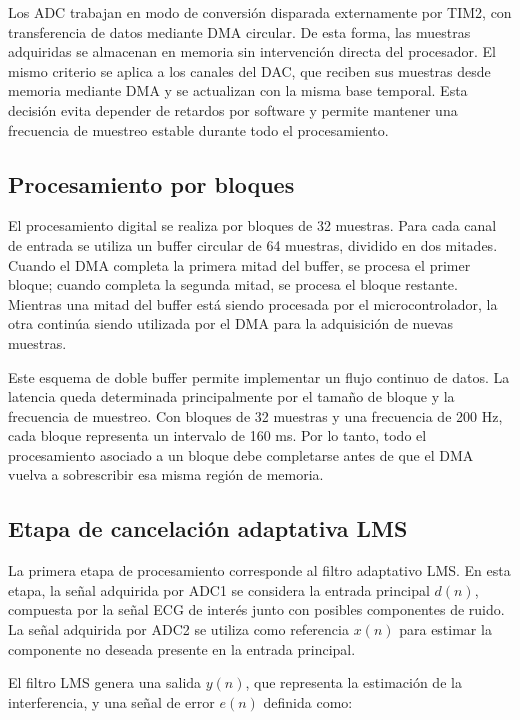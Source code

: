 \documentclass[12pt]{article}
\begin{document}
		Los ADC trabajan en modo de conversión disparada externamente por TIM2, con transferencia de datos mediante DMA circular. De esta forma, las muestras adquiridas se almacenan en memoria sin intervención directa del procesador. El mismo criterio se aplica a los canales del DAC, que reciben sus muestras desde memoria mediante DMA y se actualizan con la misma base temporal. Esta decisión evita depender de retardos por software y permite mantener una frecuencia de muestreo estable durante todo el procesamiento.

		\subsection{Procesamiento por bloques}

		El procesamiento digital se realiza por bloques de 32 muestras. Para cada canal de entrada se utiliza un buffer circular de 64 muestras, dividido en dos mitades. Cuando el DMA completa la primera mitad del buffer, se procesa el primer bloque; cuando completa la segunda mitad, se procesa el bloque restante. Mientras una mitad del buffer está siendo procesada por el microcontrolador, la otra continúa siendo utilizada por el DMA para la adquisición de nuevas muestras.

		Este esquema de doble buffer permite implementar un flujo continuo de datos. La latencia queda determinada principalmente por el tamaño de bloque y la frecuencia de muestreo. Con bloques de 32 muestras y una frecuencia de 200 Hz, cada bloque representa un intervalo de 160 ms. Por lo tanto, todo el procesamiento asociado a un bloque debe completarse antes de que el DMA vuelva a sobrescribir esa misma región de memoria.

		\subsection{Etapa de cancelación adaptativa LMS}

		La primera etapa de procesamiento corresponde al filtro adaptativo LMS. En esta etapa, la señal adquirida por ADC1 se considera la entrada principal $d(n)$, compuesta por la señal ECG de interés junto con posibles componentes de ruido. La señal adquirida por ADC2 se utiliza como referencia $x(n)$ para estimar la componente no deseada presente en la entrada principal.

		El filtro LMS genera una salida $y(n)$, que representa la estimación de la interferencia, y una señal de error $e(n)$ definida como:
\end{document}
